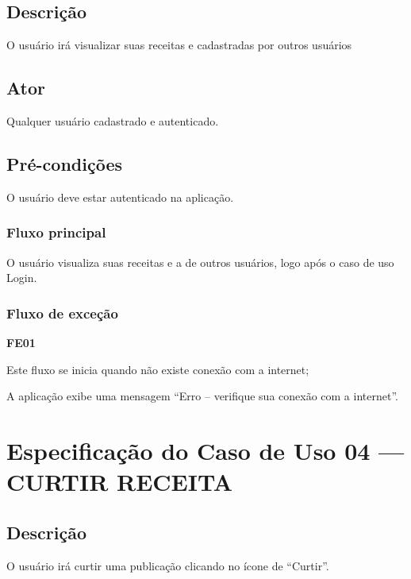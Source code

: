 \subsection*{Descrição}
O usuário irá visualizar suas receitas e cadastradas por outros usuários 

\subsection*{Ator}
Qualquer usuário cadastrado e autenticado.

\subsection*{Pré-condições}
O usuário deve estar autenticado na aplicação. 

\subsubsection*{Fluxo principal}
\begin{lista}
	\item O usuário visualiza suas receitas e a de outros usuários, logo após o caso de uso Login.

\end{lista}

\subsubsection*{Fluxo de exceção}
\begin{lista}
	\item \textbf{FE01}
	\begin{lista}
		\item Este fluxo se inicia quando não existe conexão com a internet;
		\item A aplicação exibe uma mensagem “Erro – verifique sua conexão com a internet”.
	\end{lista}
\end{lista}
\pagebreak


\section*{Especificação do Caso de Uso 04 --- CURTIR RECEITA}
\subsection*{Descrição}
O usuário irá curtir uma publicação clicando no ícone de “Curtir”.

